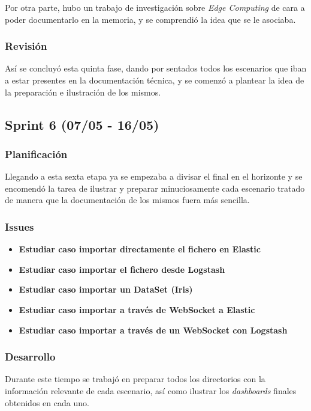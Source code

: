Por otra parte, hubo un trabajo de investigación sobre \textit{Edge Computing} de cara a poder documentarlo en la memoria, y se comprendió la idea que se le asociaba.

\subsubsection{Revisión}
Así se concluyó esta quinta fase, dando por sentados todos los escenarios que iban a estar presentes en la documentación técnica, y se comenzó a plantear la idea de la preparación e ilustración de los mismos.

\subsection{Sprint 6 (07/05 - 16/05)}
\subsubsection{Planificación}
Llegando a esta sexta etapa ya se empezaba a divisar el final en el horizonte y se encomendó la tarea de ilustrar y preparar minuciosamente cada escenario tratado de manera que la documentación de los mismos fuera más sencilla.

\subsubsection{Issues}
\begin{itemize}
    \item \textbf{Estudiar caso importar directamente el fichero en Elastic}
    \item \textbf{Estudiar caso importar el fichero desde Logstash}
    \item \textbf{Estudiar caso importar un DataSet (Iris)}
    \item \textbf{Estudiar caso importar a través de WebSocket a Elastic}
    \item \textbf{Estudiar caso importar a través de un WebSocket con Logstash}

    \end{itemize}
    

\subsubsection{Desarrollo}
Durante este tiempo se trabajó en preparar todos los directorios con la información relevante de cada escenario, así como ilustrar los \textit{dashboards} finales obtenidos en cada uno.

